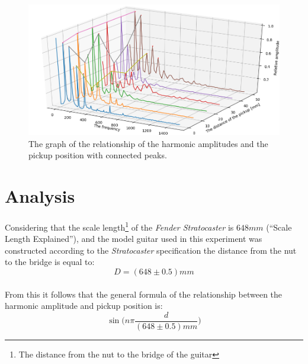 \documentclass{article}
\begin{document}
\begin{figure}[ht]
	\centering
	\includegraphics[width=\textwidth]{img/final-graph-c}
	\caption{The graph of the relationship of the harmonic amplitudes and the 
	pickup position with connected peaks.}
	\label{fig:final-graph-c}
\end{figure}

\section{Analysis}

\paragraph*{}
Considering that the scale length\footnote{The distance from the nut to the 
bridge of the guitar} of the \textit{Fender Stratocaster} is $648\si{mm}$ 
(``Scale Length Explained''), and the model guitar used in this experiment was 
constructed according to the \textit{Stratocaster} specification the distance 
from the nut to the bridge is equal to:
$$D = (648 \pm 0.5)\si{mm}$$

\paragraph*{}
From this it follows that the general formula of the relationship between the 
harmonic amplitude and pickup position is:
$$\sin \bigg(n \pi \frac{d}{(648 \pm 0.5) \si{mm}} \bigg)$$
\end{document}
